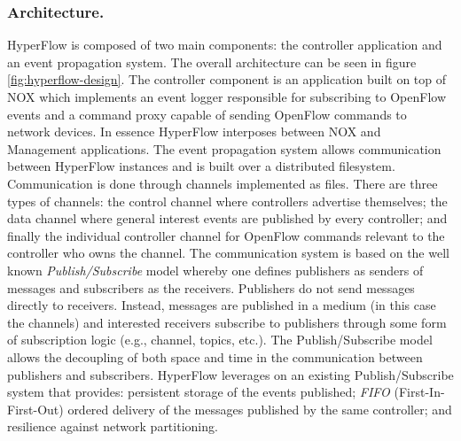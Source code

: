 \begin{itemize}
\subsubsection{Architecture.} HyperFlow is composed of two main components: the controller application
and an event propagation system. The overall architecture can be seen
in figure \ref{fig:hyperflow-design}. The controller component is
an application built on top of NOX \cite{Gude:2008jd} which implements an event logger
responsible for subscribing to OpenFlow events and a command proxy
capable of sending OpenFlow commands to  network devices. In essence
HyperFlow interposes  between NOX and
Management applications. The event
propagation system allows  communication between HyperFlow
instances and  is built over a distributed filesystem. Communication
is done through channels implemented as files. There are three types of channels: the
control channel where controllers advertise themselves; the data
channel where general interest events are published by every
controller;  and finally the individual controller channel for OpenFlow
commands relevant to the controller who owns the channel. The
communication system is based on the well known \emph{Publish/Subscribe}
model  whereby one defines publishers as senders of
messages and subscribers as the receivers. Publishers do not send
messages directly  to receivers.  Instead,
messages are published in a medium (in this case the channels) and
interested receivers subscribe to publishers through some form of
subscription logic (e.g., channel, topics, etc.). The Publish/Subscribe
model allows the decoupling of both space and time in the
communication between publishers and subscribers. 
HyperFlow leverages on an existing Publish/Subscribe system that provides: 
persistent storage of the events published; \emph{FIFO}
(First-In-First-Out)  ordered delivery of
the messages published by the same controller; and resilience against
network partitioning.


\end{itemize}
